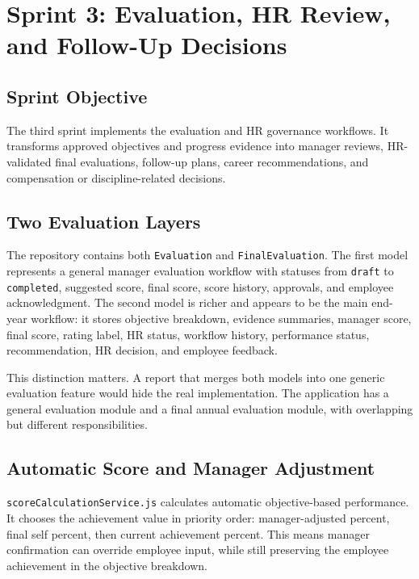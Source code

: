 \chapter{Sprint 3: Evaluation, HR Review, and Follow-Up Decisions}
\section{Sprint Objective}
The third sprint implements the evaluation and HR governance workflows. It transforms approved objectives and progress evidence into manager reviews, HR-validated final evaluations, follow-up plans, career recommendations, and compensation or discipline-related decisions.

\section{Two Evaluation Layers}
The repository contains both \texttt{Evaluation} and \texttt{FinalEvaluation}. The first model represents a general manager evaluation workflow with statuses from \texttt{draft} to \texttt{completed}, suggested score, final score, score history, approvals, and employee acknowledgment. The second model is richer and appears to be the main end-year workflow: it stores objective breakdown, evidence summaries, manager score, final score, rating label, HR status, workflow history, performance status, recommendation, HR decision, and employee feedback.

This distinction matters. A report that merges both models into one generic evaluation feature would hide the real implementation. The application has a general evaluation module and a final annual evaluation module, with overlapping but different responsibilities.



\section{Automatic Score and Manager Adjustment}
\texttt{scoreCalculationService.js} calculates automatic objective-based performance. It chooses the achievement value in priority order: manager-adjusted percent, final self percent, then current achievement percent. This means manager confirmation can override employee input, while still preserving the employee achievement in the objective breakdown.


